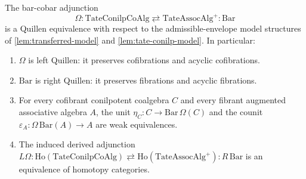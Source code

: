 \begin{thm}
  \label{thm:tate-bar-cobar-quillen}
  The bar-cobar adjunction
  $$\Omega\colon\mathrm{TateConilpCoAlg}\rightleftarrows
    \mathrm{TateAssocAlg}^+\colon\mathrm{Bar}$$
  is a Quillen equivalence with respect to the admissible-envelope
  model structures
  of \ref{lem:transferred-model} and \ref{lem:tate-conilp-model}.
  In particular:
  \begin{enumerate}
    \item $\Omega$ is left Quillen: it preserves cofibrations and
      acyclic cofibrations.
    \item $\mathrm{Bar}$ is right Quillen: it preserves
      fibrations and acyclic fibrations.
    \item For every cofibrant conilpotent coalgebra $C$ and every
      fibrant augmented associative algebra $A$, the unit
      $\eta_C\colon C\to\mathrm{Bar}\,\Omega(C)$ and the counit
      $\varepsilon_A\colon\Omega\,\mathrm{Bar}(A)\to A$ are weak
      equivalences.
    \item The induced derived adjunction
      $L\Omega\colon\mathrm{Ho}(\mathrm{TateConilpCoAlg})
      \rightleftarrows\mathrm{Ho}(\mathrm{TateAssocAlg}^+)\colon
      R\,\mathrm{Bar}$ is an equivalence of homotopy categories.
  \end{enumerate}
\end{thm}

